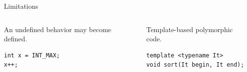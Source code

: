 \documentclass[11pt]{beamer}
\begin{document}
\begin{frame}[fragile]{Limitations}
\begin{columns}

\begin{column}{0.45\textwidth}
\pause
An undefined behavior may become defined.
\pause
\begin{lstlisting}
int x = INT_MAX;
x++;
\end{lstlisting}
\end{column}

\begin{column}{0.55\textwidth}
\pause
Template-based polymorphic code.
\pause
\begin{lstlisting}
template <typename It>
void sort(It begin, It end);
\end{lstlisting}
\end{column}

\end{columns}
\end{frame}
\end{document}
